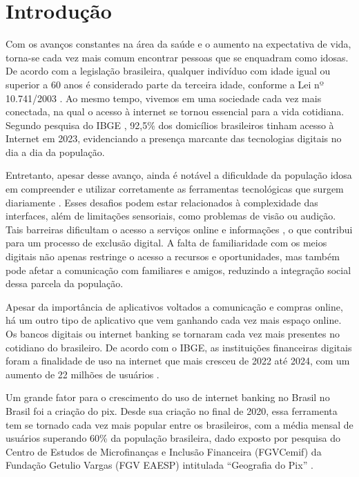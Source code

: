 \chapter{Introdução}

Com os avanços constantes na área da saúde e o aumento na expectativa de vida, torna-se cada vez mais comum encontrar pessoas que se enquadram como idosas. De acordo com a legislação brasileira, qualquer indivíduo com idade igual ou superior a 60 anos é considerado parte da terceira idade, conforme a Lei nº 10.741/2003 \citep{estatuto_idoso}. Ao mesmo tempo, vivemos em uma sociedade cada vez mais conectada, na qual o acesso à internet se tornou essencial para a vida cotidiana. Segundo pesquisa do IBGE \citep{ibge_internet_2023}, 92,5\% dos domicílios brasileiros tinham acesso à Internet em 2023, evidenciando a presença marcante das tecnologias digitais no dia a dia da população.

Entretanto, apesar desse avanço, ainda é notável a dificuldade da população idosa em compreender e utilizar corretamente as ferramentas tecnológicas que surgem diariamente \citep{kachar2010}. Esses desafios podem estar relacionados à complexidade das interfaces, além de limitações sensoriais, como problemas de visão ou audição. Tais barreiras dificultam o acesso a serviços online e informações \citep{santos2023}, o que contribui para um processo de exclusão digital. A falta de familiaridade com os meios digitais não apenas restringe o acesso a recursos e oportunidades, mas também pode afetar a comunicação com familiares e amigos, reduzindo a integração social dessa parcela da população.

Apesar da importância de aplicativos voltados a comunicação e compras online, há um outro tipo de aplicativo que vem ganhando cada vez mais espaço online. Os bancos digitais ou internet banking se tornaram cada vez mais presentes no cotidiano do brasileiro. De acordo com o IBGE, as instituições financeiras digitais foram a finalidade de uso na internet que mais cresceu de 2022 até 2024, com um aumento de 22 milhões de usuários \citep{ibge_tic_2025}.

Um grande fator para o crescimento do uso de internet banking no Brasil no Brasil foi a criação do pix. Desde sua criação no final de 2020, essa ferramenta tem se tornado cada vez mais popular entre os brasileiros, com a média mensal de usuários superando 60\% da população brasileira, dado exposto por pesquisa do Centro de Estudos de Microfinanças e Inclusão Financeira (FGVCemif) da Fundação Getulio Vargas (FGV EAESP) intitulada “Geografia do Pix” \citep{fgv_geografia_pix_2025}.

